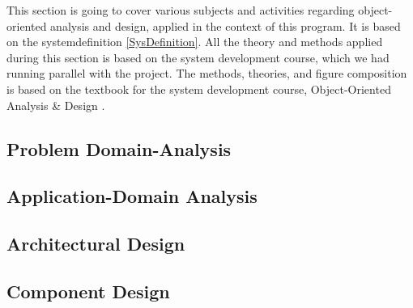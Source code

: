 This section is going to cover various subjects and activities regarding object-oriented analysis and design, applied in the context of this program. It is based on the systemdefinition \ref{SysDefinition}. All the theory and methods applied during this section is based on the system development course, which we had running parallel with the project. The methods, theories, and figure composition is based on the textbook for the system development course, Object-Oriented Analysis \& Design \citep{ObjektAnalyseDesign}.

\subsection{Problem Domain-Analysis}
\label{ProblemDomain}

\subsection{Application-Domain Analysis}
\label{ApplicationDomain}

\subsection{Architectural Design}
\label{ArchDes}

\subsection{Component Design}
\label{ComponentDesign}
